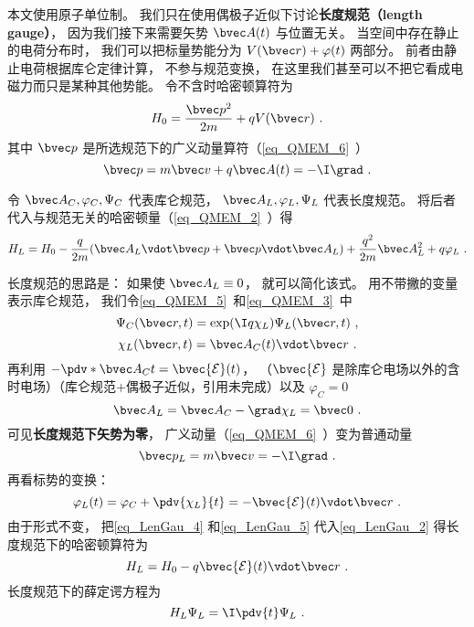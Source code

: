 

本文使用原子单位制。 我们只在使用偶极子近似下讨论\textbf{长度规范（length gauge）}， 因为我们接下来需要矢势 $\bvec A(t)$ 与位置无关。 当空间中存在静止的电荷分布时， 我们可以把标量势能分为 $V(\bvec r) + \varphi(t)$ 两部分。 前者由静止电荷根据库仑定律计算， 不参与规范变换， 在这里我们甚至可以不把它看成电磁力而只是某种其他势能。 令不含时哈密顿算符为
\begin{equation}
H_0 = \frac{\bvec p^2}{2m} + qV(\bvec r)~.
\end{equation}
其中 $\bvec p$ 是所选规范下的广义动量算符（\autoref{eq_QMEM_6}~）
\begin{equation}
\bvec p = m \bvec v + q\bvec A(t) = -\I \grad~.
\end{equation}

令 $\bvec A_C, \varphi_C, \Psi_C$ 代表库仑规范， $\bvec A_L, \varphi_L, \Psi_L$ 代表长度规范。 将后者代入与规范无关的哈密顿量（\autoref{eq_QMEM_2}~）得
\begin{equation}\label{eq_LenGau_2}
H_L = H_0 - \frac{q}{2m} (\bvec A_L \vdot \bvec p + \bvec p \vdot \bvec A_L)
+ \frac{q^2}{2m} \bvec A_L^2 + q \varphi_L~.
\end{equation}


长度规范的思路是： 如果使 $\bvec A_L \equiv 0$， 就可以简化该式。 用不带撇的变量表示库仑规范， 我们令\autoref{eq_QMEM_5}~和\autoref{eq_QMEM_3}~中
\begin{equation}\label{eq_LenGau_1}
\Psi_C(\bvec r, t) = \exp(\I q\chi_L)\Psi_L(\bvec r, t)~,
\end{equation}
\begin{equation}
\chi_L(\bvec r, t) = \bvec A_C(t) \vdot \bvec r~.
\end{equation}
再利用 $-\pdv*{\bvec A_C}{t} = \bvec {\mathcal E}(t)$， （$\bvec {\mathcal E}$ 是除库仑电场以外的含时电场）（库仑规范+偶极子近似，引用未完成）以及 $\varphi_C = 0$
\begin{equation}\label{eq_LenGau_4}
\bvec A_L = \bvec A_C - \grad \chi_L = \bvec 0~.
\end{equation}
可见\textbf{长度规范下矢势为零}， 广义动量（\autoref{eq_QMEM_6}~）变为普通动量
\begin{equation}\label{eq_LenGau_6}
\bvec p_L = m \bvec v = -\I \grad~.
\end{equation}
再看标势的变换：
\begin{equation}\label{eq_LenGau_5}
\varphi_L(t) = \varphi_C + \pdv{\chi_L}{t} = -\bvec {\mathcal E}(t) \vdot \bvec r~.
\end{equation}
由于形式不变， 把\autoref{eq_LenGau_4} 和\autoref{eq_LenGau_5} 代入\autoref{eq_LenGau_2} 得长度规范下的哈密顿算符为
\begin{equation}\label{eq_LenGau_7}
H_L = H_0 - q\bvec{\mathcal{E}}(t) \vdot \bvec r~.
\end{equation}
长度规范下的薛定谔方程为
\begin{equation}\label{eq_LenGau_3}
H_L \Psi_L = \I \pdv{t} \Psi_L~.
\end{equation}
